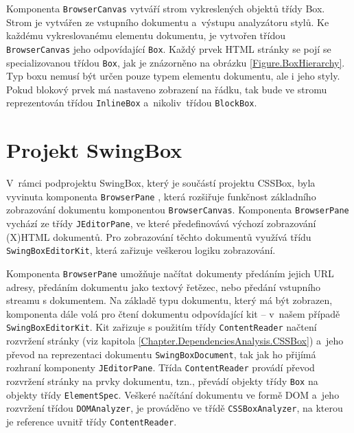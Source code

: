 Komponenta \texttt{BrowserCanvas} vytváří strom vykreslených objektů třídy Box. Strom je vytvářen ze vstupního dokumentu a~výstupu analyzátoru stylů. Ke každému vykreslovanému elementu dokumentu, je vytvořen třídou \texttt{BrowserCanvas} jeho odpovídající \texttt{Box}. Každý prvek HTML stránky se pojí se specializovanou třídou \texttt{Box}, jak je znázorněno na obrázku \ref{Figure.BoxHierarchy}. Typ boxu nemusí být určen pouze typem elementu dokumentu, ale i jeho styly. Pokud blokový prvek má nastaveno zobrazení na řádku, tak bude ve stromu reprezentován třídou \texttt{InlineBox} a~nikoliv~třídou \texttt{BlockBox}. 

\clearpage

\section{Projekt SwingBox}
\label{Chapter.DependenciesAnalysis.SwingBox}

V~rámci podprojektu SwingBox, který je součástí projektu CSSBox, byla vyvinuta komponenta \texttt{BrowserPane} \cite{Bibliography.SwingBox.Thesis}, která rozšiřuje funkčnost základního zobrazování dokumentu komponentou \texttt{BrowserCanvas}. Komponenta \texttt{BrowserPane} vychází ze třídy \texttt{JEditorPane}, ve které předefinovává výchozí zobrazování (X)HTML dokumentů. Pro zobrazování těchto dokumentů využívá třídu \texttt{SwingBoxEditorKit}, která zařizuje veškerou logiku zobrazování.

Komponenta \texttt{BrowserPane} umožňuje načítat dokumenty předáním jejich URL adresy, předáním dokumentu jako textový řetězec, nebo předání vstupního streamu s dokumentem. Na základě typu dokumentu, který má být zobrazen, komponenta dále volá pro čtení dokumentu odpovídající kit -- v~našem případě \texttt{SwingBoxEditorKit}. Kit zařizuje s použitím třídy \texttt{ContentReader} načtení rozvržení stránky (viz kapitola \ref{Chapter.DependenciesAnalysis.CSSBox}) a~jeho převod na reprezentaci dokumentu \texttt{SwingBoxDocument}, tak jak ho přijímá rozhraní komponenty \texttt{JEditorPane}. Třída \texttt{ContentReader} provádí převod rozvržení stránky na prvky dokumentu, tzn., převádí objekty třídy \texttt{Box} na objekty třídy \texttt{ElementSpec}. Veškeré načítání dokumentu ve formě DOM a~jeho rozvržení třídou \texttt{DOMAnalyzer}, je prováděno ve třídě \texttt{CSSBoxAnalyzer}, na kterou je reference uvnitř třídy \texttt{ContentReader}.

